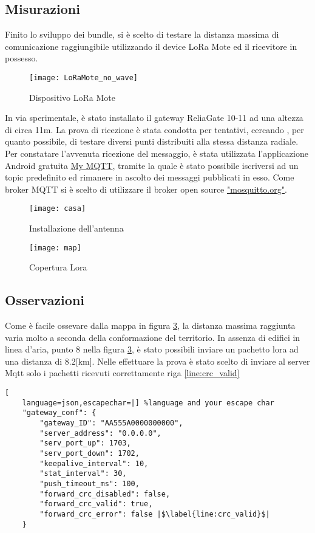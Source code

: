 \subsection{Misurazioni}
Finito lo sviluppo dei bundle, si è scelto di testare la distanza massima
di comunicazione raggiungibile utilizzando il device LoRa Mote ed il ricevitore in
possesso.
\begin{figure}[h]
        \centering 
                \texttt{[image: LoRaMote\_no\_wave]}
        \caption{Dispositivo LoRa Mote}
        \label{fig:Software_stack}
\end{figure}
In via sperimentale, è stato installato  il gateway
ReliaGate 10-11 ad una altezza di circa 11m. La prova di ricezione è stata condotta per
tentativi, cercando , per quanto possibile, di testare diversi punti distribuiti
alla stessa distanza radiale.
Per constatare l'avvenuta ricezione del
messaggio, è stata utilizzata l'applicazione Android gratuita \href{
https://play.google.com/store/apps/details?id=at.tripwire.mqtt.client&hl=en}{My
MQTT}, tramite la
quale è stato possibile iscriversi ad un topic predefinito ed rimanere in ascolto dei
messaggi pubblicati in esso. 
Come broker MQTT si è scelto di utilizzare il
broker open source \href{http://mosquitto.org/}{"mosquitto.org"}. 
\begin{figure}[h]
        \centering 
                \texttt{[image: casa]}
        \caption{Installazione dell'antenna}
        \label{fig:Software_stack}
\end{figure}

\begin{figure}[h]
\centering 
\texttt{[image: map]}
\caption{Copertura Lora}
\label{fig:map}
\end{figure}

\subsection{Osservazioni}
Come è facile ossevare dalla mappa in figura \ref{fig:map}, la distanza
massima raggiunta varia molto a seconda della conformazione del territorio. In
assenza di edifici in linea d'aria,  punto 8 nella figura \ref{fig:map}, è stato
possibili inviare un pachetto lora ad una distanza di 8.2[km]. Nelle effettuare
la prova è stato scelto di inviare al server Mqtt solo i pachetti ricevuti
correttamente riga \ref{line:crc_valid}
\begin{lstlisting}[
    language=json,escapechar=|] %language and your escape char
    "gateway_conf": {
        "gateway_ID": "AA555A0000000000",
        "server_address": "0.0.0.0",
        "serv_port_up": 1703,
        "serv_port_down": 1702,
        "keepalive_interval": 10,
        "stat_interval": 30,
        "push_timeout_ms": 100,
        "forward_crc_disabled": false,
        "forward_crc_valid": true, 
        "forward_crc_error": false |$\label{line:crc_valid}$|
    }
\end{lstlisting}

